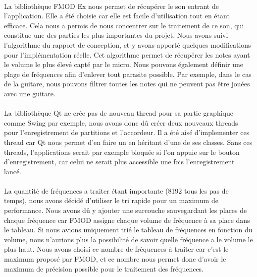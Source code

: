 \paragraph{}
La bibliothèque FMOD Ex nous permet de récupérer le son entrant de l'application. Elle a été choisie car elle est facile 
d'utilisation tout en étant efficace. Cela nous a permis de nous concentrer sur le traitement de ce son, qui constitue 
une des parties les plus importantes du projet. Nous avons suivi l'algorithme du rapport de conception, et y avons apporté 
quelques modifications pour l'implémentation réelle. Cet algorithme permet de récupérer les notes ayant le volume le plus 
élevé capté par le micro. Nous pouvons également définir une plage de fréquences afin d'enlever tout parasite possible. Par exemple, 
dans le cas de la guitare, nous pouvons filtrer toutes les notes qui ne peuvent pas être jouées avec une guitare. 

\paragraph{}
La bibliothèque Qt ne crée pas de nouveau thread pour sa partie graphique comme Swing par exemple, nous avons donc dû créer deux nouveaux 
threads pour l'enregistrement de partitions et l'accordeur. Il a été aisé d'implementer ces thread car Qt nous permet d'en 
faire un en héritant d'une de ses classes. Sans ces threads, l'applications serait par exemple bloquée si l'on appuie sur le 
bouton d'enregistrement, car celui ne serait plus accessible une fois l'enregistrement lancé.

\paragraph{}
La quantité de fréquences a traiter étant importante (8192 tous les pas de temps), nous avons décidé d'utiliser 
le tri rapide pour un maximum de performance. Nous avons dû y ajouter une surcouche sauvegardant les places de chaque fréquence 
car FMOD assigne chaque volume de fréquence à sa place dans le tableau. Si nous avions uniquement trié le tableau de fréquences 
en fonction du volume, nous n'aurions plus la possibilité de savoir quelle fréquence a le volume le plus haut. Nous avons choisi 
ce nombre de fréquences à traiter car c'est le maximum proposé par FMOD, et ce nombre nous permet donc d'avoir le maximum de 
précision possible pour le traitement des fréquences.

